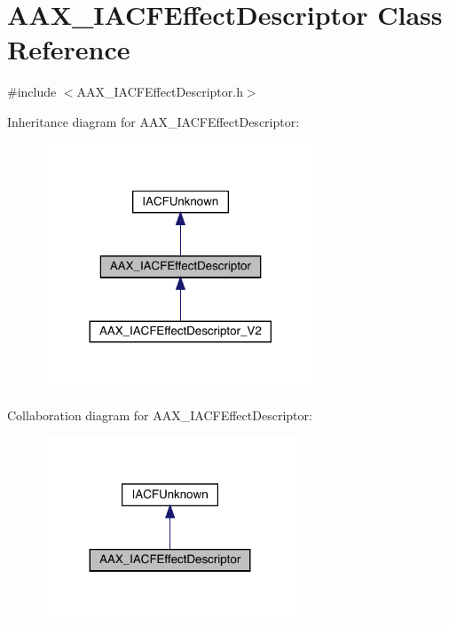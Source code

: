 \hypertarget{a01653}{}\section{A\+A\+X\+\_\+\+I\+A\+C\+F\+Effect\+Descriptor Class Reference}
\label{a01653}


{\ttfamily \#include $<$A\+A\+X\+\_\+\+I\+A\+C\+F\+Effect\+Descriptor.\+h$>$}



Inheritance diagram for A\+A\+X\+\_\+\+I\+A\+C\+F\+Effect\+Descriptor\+:
\nopagebreak
\begin{figure}[H]
\begin{center}
\leavevmode
\includegraphics[width=233pt]{a01652}
\end{center}
\end{figure}


Collaboration diagram for A\+A\+X\+\_\+\+I\+A\+C\+F\+Effect\+Descriptor\+:
\nopagebreak
\begin{figure}[H]
\begin{center}
\leavevmode
\includegraphics[width=215pt]{a01651}
\end{center}
\end{figure}


